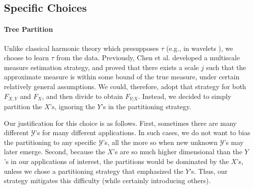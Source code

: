 \documentclass{article} %
\newcommand{\Real}{\mathbb{R}}
\providecommand{\mc}[1]{\mathcal{#1}}
\newcommand{\from}{{\ensuremath{\colon}}}  %
\begin{document}

\subsection{Specific Choices} \label{sub:spec}

	\paragraph{Tree Partition} Unlike classical harmonic theory which presupposes $\tau$ (e.g., in wavelets \cite{Daubechies1992}), we choose to learn $\tau$ from the data. Previously, Chen et al. \cite{ChenMaggioni12} developed a multiscale measure estimation strategy, and proved that there exists a scale $j$ such that the approximate measure is within some bound of the true measure, under certain relatively general assumptions.  We could, therefore, adopt that strategy for both $F_{X,Y}$ and $F_{X}$, and then divide to obtain $F_{Y|X}$.  Instead, we decided to simply partition the $X$'s, ignoring the $Y$'s in the partitioning strategy.  
	
	Our justification for this choice is as follows. First, sometimes there are many different $\mc{Y}$'s for many different applications.  In such cases, we do not want to bias the partitioning to any specific $\mc{Y}$'s, all the more so when new unknown $\mc{Y}$'s may later emerge.  Second, because the $X$'s are so much higher dimensional than the $Y$'s in our applications of interest, the partitions would be dominated by the $X$'s, unless we chose a partitioning strategy that emphasized the $Y$'s.  Thus, our strategy mitigates this difficulty (while certainly introducing others). 
\end{document}
